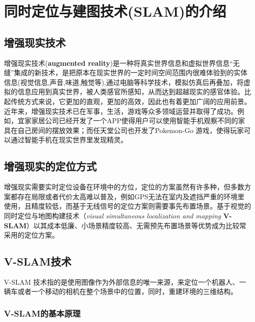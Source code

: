 \chapter{同时定位与建图技术(SLAM)的介绍}
\section{增强现实技术}
增强现实技术(\textbf{augmented reality})是一种将真实世界信息和虚拟世界信息“无缝”集成的新技术，是把原本在现实世界的一定时间空间范围内很难体验到的实体信息(视觉信息,声音,味道,触觉等),通过电脑等科学技术，模拟仿真后再叠加，将虚拟的信息应用到真实世界，被人类感官所感知，从而达到超越现实的感官体验。比起传统方式来说，它更加的直观，更加的高效，因此也有着更加广阔的应用前景。近年来，增强现实技术已在军事，生活，游戏等众多领域运营并取得了成功。例如，宜家家居公司已经开发了一个APP使得用户可以使用智能手机观察不同的家具在自己房间的摆放效果；而任天堂公司也开发了Pokemon-Go 游戏，使得玩家可以通过智能手机在现实世界里发现精灵。

\section{增强现实的定位方式}
增强现实需要实时定位设备在环境中的方位，定位的方案虽然有许多种，但多数方案都存在局限或者代价太高难以普及，例如GPS无法在室内及遮挡严重的环境里使用，且精度较低，而基于无线信号的定位方案则需要事先布置场景。基于视觉的同时定位与地图构建技术（\textit{visual simultaneous localization and mapping} \textbf{V-SLAM}）以其成本低廉、小场景精度较高、无需预先布置场景等优势成为比较常采用的定位方案。

\section{V-SLAM技术}
V-SLAM 技术指的是使用图像作为外部信息的唯一来源，来定位一个机器人、一辆车或者一个移动的相机在整个场景中的位置，同时，重建环境的三维结构。


\subsection{V-SLAM的基本原理}

